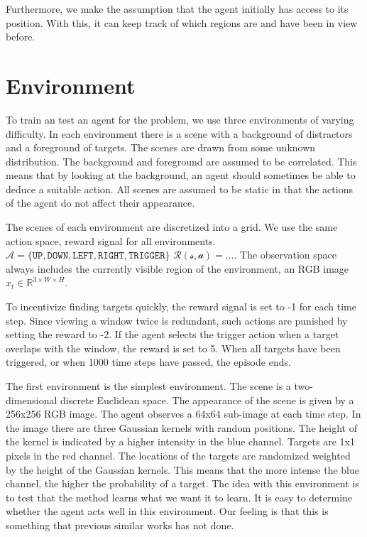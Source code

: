 Furthermore, we make the assumption that the agent initially has access to its position.
With this, it can keep track of which regions are and have been in view before.


\section{Environment}
\label{sec:environment}

To train an test an agent for the problem, we use three environments of varying difficulty.
In each environment there is a scene with a background of distractors and a foreground of targets.
The scenes are drawn from some unknown distribution.
The background and foreground are assumed to be correlated.
This means that by looking at the background, an agent should sometimes be able to deduce a suitable action.
All scenes are assumed to be static in that the actions of the agent do not affect their appearance.

The scenes of each environment are discretized into a grid.
We use the same action space, reward signal for all environments.
\(\mathcal{A} = \lbrace \mathtt{UP}, \mathtt{DOWN}, \mathtt{LEFT}, \mathtt{RIGHT}, \mathtt{TRIGGER} \rbrace\)
\(\mathcal{R(s, a)} = \dots\).
The observation space always includes the currently visible region of the environment, an RGB image \(x_t \in \mathbb{R}^{3 \times W \times H}\).


To incentivize finding targets quickly, the reward signal is set to -1 for each time step.
Since viewing a window twice is redundant, such actions are punished by setting the reward to -2.
If the agent selects the trigger action when a target overlaps with the window, the reward is set to 5.
When all targets have been triggered, or when 1000 time steps have passed, the episode ends.

The first environment is the simplest environment. 
The scene is a two-dimensional discrete Euclidean space.
The appearance of the scene is given by a 256x256 RGB image.
The agent observes a 64x64 sub-image at each time step.
In the image there are three Gaussian kernels with random positions.
The height of the kernel is indicated by a higher intensity in the blue channel.
Targets are 1x1 pixels in the red channel.
The locations of the targets are randomized weighted by the height of the Gaussian kernels.
This means that the more intense the blue channel, the higher the probability of a target.
The idea with this environment is to test that the method learns what we want it to learn.
It is easy to determine whether the agent acts well in this environment.
Our feeling is that this is something that previous similar works has not done. %

